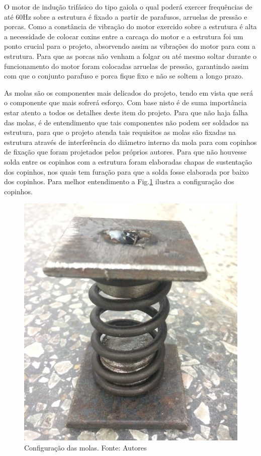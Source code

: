 
    O motor de indução trifásico do tipo gaiola o qual poderá exercer frequências de até 60Hz sobre a estrutura é fixado a partir de parafusos, arruelas de pressão e porcas. Como a constância de vibração do motor exercido sobre a estrutura é alta a necessidade de colocar coxins entre a carcaça do motor e a estrutura foi um ponto crucial para o projeto, absorvendo assim as vibrações do motor para com a estrutura. Para que as porcas não venham a folgar ou até mesmo soltar durante o funcionamento do motor foram colocadas arruelas de pressão, garantindo assim com que o conjunto parafuso e porca fique fixo e não se soltem a longo prazo.


    As molas são os componentes mais delicados do projeto, tendo em vista que será o componente que mais sofrerá esforço. Com base nisto é de suma importância estar atento a todos os detalhes deste item do projeto. Para que não haja falha das molas, é de entendimento que tais componentes não podem ser soldados na estrutura, para que o projeto atenda tais requisitos as molas são fixadas na estrutura através de interferência do diâmetro interno da mola para com copinhos de fixação que foram projetados pelos próprios autores. Para que não houvesse solda entre os copinhos com a estrutura foram elaboradas chapas de sustentação dos copinhos, nos quais tem furação para que a solda fosse elaborada por baixo dos copinhos. Para melhor entendimento a Fig.\ref{fig:config_copinhos} ilustra a configuração dos copinhos.

\begin{figure}[H]
\centering
\includegraphics[scale=0.5]{figuras/config_copinhos.png}
\caption{Configuração das molas. Fonte: Autores}
\label{fig:config_copinhos}
\end{figure}


